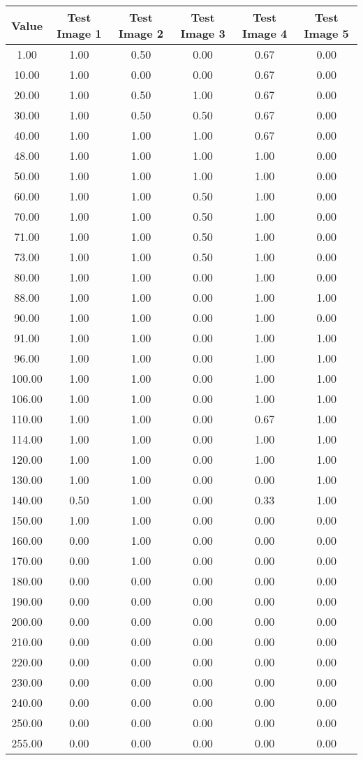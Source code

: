 \begin{tabular}{|c|c|c|c|c|c|}
\hline
\textbf{Value}&\textbf{Test Image 1}&\textbf{Test Image 2}&\textbf{Test Image 3}&\textbf{Test Image 4}&\textbf{Test Image 5}\\\hline
1.00&1.00&0.50&0.00&0.67&0.00\\\hline
10.00&1.00&0.00&0.00&0.67&0.00\\\hline
20.00&1.00&0.50&1.00&0.67&0.00\\\hline
30.00&1.00&0.50&0.50&0.67&0.00\\\hline
40.00&1.00&1.00&1.00&0.67&0.00\\\hline
48.00&1.00&1.00&1.00&1.00&0.00\\\hline
50.00&1.00&1.00&1.00&1.00&0.00\\\hline
60.00&1.00&1.00&0.50&1.00&0.00\\\hline
70.00&1.00&1.00&0.50&1.00&0.00\\\hline
71.00&1.00&1.00&0.50&1.00&0.00\\\hline
73.00&1.00&1.00&0.50&1.00&0.00\\\hline
80.00&1.00&1.00&0.00&1.00&0.00\\\hline
88.00&1.00&1.00&0.00&1.00&1.00\\\hline
90.00&1.00&1.00&0.00&1.00&0.00\\\hline
91.00&1.00&1.00&0.00&1.00&1.00\\\hline
96.00&1.00&1.00&0.00&1.00&1.00\\\hline
100.00&1.00&1.00&0.00&1.00&1.00\\\hline
106.00&1.00&1.00&0.00&1.00&1.00\\\hline
110.00&1.00&1.00&0.00&0.67&1.00\\\hline
114.00&1.00&1.00&0.00&1.00&1.00\\\hline
120.00&1.00&1.00&0.00&1.00&1.00\\\hline
130.00&1.00&1.00&0.00&0.00&1.00\\\hline
140.00&0.50&1.00&0.00&0.33&1.00\\\hline
150.00&1.00&1.00&0.00&0.00&0.00\\\hline
160.00&0.00&1.00&0.00&0.00&0.00\\\hline
170.00&0.00&1.00&0.00&0.00&0.00\\\hline
180.00&0.00&0.00&0.00&0.00&0.00\\\hline
190.00&0.00&0.00&0.00&0.00&0.00\\\hline
200.00&0.00&0.00&0.00&0.00&0.00\\\hline
210.00&0.00&0.00&0.00&0.00&0.00\\\hline
220.00&0.00&0.00&0.00&0.00&0.00\\\hline
230.00&0.00&0.00&0.00&0.00&0.00\\\hline
240.00&0.00&0.00&0.00&0.00&0.00\\\hline
250.00&0.00&0.00&0.00&0.00&0.00\\\hline
255.00&0.00&0.00&0.00&0.00&0.00\\\hline
\end{tabular}
